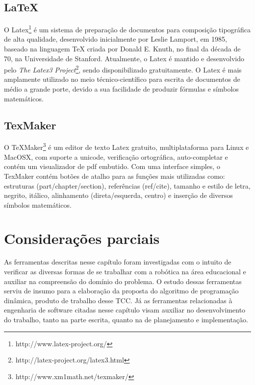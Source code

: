\subsection{LaTeX}
O Latex\footnote{http://www.latex-project.org/} é um sistema de preparação de documentos para composição tipográfica de alta qualidade, desenvolvido inicialmente por Leslie Lamport, em 1985, baseado na linguagem TeX criada por Donald E. Knuth, no final da década de 70, na Universidade de Stanford. Atualmente, o Latex é mantido e desenvolvido pelo \textit{The Latex3 Project}\footnote{http://latex-project.org/latex3.html}, sendo disponibilizado gratuitamente.
O Latex é mais amplamente utilizado no meio técnico-científico para escrita de documentos de médio a grande porte, devido a sua facilidade de produzir fórmulas e símbolos matemáticos. 

\subsection{TexMaker}
O TeXMaker\footnote{http://www.xm1math.net/texmaker/} é um editor de texto Latex gratuito, multiplataforma para Linux e MacOSX, com suporte a unicode, verificação ortográfica, auto-completar e contém um visualizador de pdf embutido.
Com uma interface simples, o TexMaker contém botões de atalho para as funções mais utilizadas como: estruturas (part/chapter/section), referências (ref/cite), tamanho e estilo de letra, negrito, itálico, alinhamento (direta/esquerda, centro) e inserção de diversos símbolos matemáticos.

\section{Considerações parciais}
As ferramentas descritas nesse capítulo foram investigadas com o intuito de verificar as diversas formas de se trabalhar com a robótica na área educacional e auxiliar na compreensão do domínio do problema. O estudo dessas ferramentas serviu de insumo para a elaboração da proposta do algoritmo de programação dinâmica, produto de trabalho desse TCC. Já as ferramentas relacionadas à engenharia de software citadas nesse capítulo visam auxiliar no desenvolvimento do trabalho, tanto na parte escrita, quanto na de planejamento e implementação.